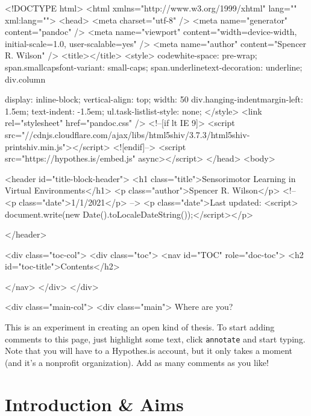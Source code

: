 <!DOCTYPE html>
<html xmlns="http://www.w3.org/1999/xhtml" lang="" xml:lang="">
  <head>
    <meta charset="utf-8" />
    <meta name="generator" content="pandoc" />
    <meta name="viewport" content="width=device-width, initial-scale=1.0, user-scalable=yes" />
        <meta name="author" content="Spencer R. Wilson" />
                <title></title>
    <style>
    code{white-space: pre-wrap;}
    span.smallcaps{font-variant: small-caps;}
    span.underline{text-decoration: underline;}
    div.column{display: inline-block; vertical-align: top; width: 50%
    div.hanging-indent{margin-left: 1.5em; text-indent: -1.5em;}
    ul.task-list{list-style: none;}
    </style>
        <link rel="stylesheet" href="pandoc.css" />
            <!--[if lt IE 9]>
    <script src="//cdnjs.cloudflare.com/ajax/libs/html5shiv/3.7.3/html5shiv-printshiv.min.js"></script>
    <![endif]-->
        <script src="https://hypothes.is/embed.js" async></script>
      </head>
  <body>
      
            <header id="title-block-header">
        <h1 class="title">Sensorimotor Learning in Virtual
Environments</h1>
                        <p class="author">Spencer R. Wilson</p>
                        <!-- <p class="date">1/1/2021</p> -->
        <p class="date">Last updated: <script> document.write(new Date().toLocaleDateString());</script></p>

              </header>
      
            <div class="toc-col">
        <div class="toc">
          <nav id="TOC" role="doc-toc">
                        <h2 id="toc-title">Contents</h2>
                        
          </nav>
        </div>
      </div>
      
      <div class="main-col">
          <div class="main">
            Where are you?

            This is an experiment in creating an open kind of thesis. To
            start adding comments to this page, just highlight some
            text, click \texttt{annotate} and start typing. Note that
            you will have to a Hypothes.is account, but it only takes a
            moment (and it's a nonprofit organization). Add as many
            comments as you like!

            \hypertarget{sec:intro}{%
            \section{Introduction \& Aims}\label{sec:intro}}

}
